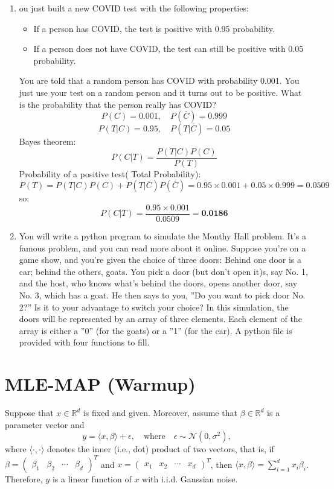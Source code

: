 \documentclass[a3paper,12pt]{extarticle} %
\begin{document}
\begin{enumerate}
\begin{enumerate}
        
    \end{enumerate}
    \item ou just built a new COVID test with the following properties:
    \begin{itemize}
        \item If a person has COVID, the test is positive with  0.95 probability.
        \item If a person does not have COVID, the test can still be positive with 0.05 probability.
    \end{itemize}
    You are told that a random person has COVID with probability 0.001. You just use your test on a random person and it turns out to be positive. What is the probability that the person really has COVID?
    \[
        P(C) = 0.001, \quad P(\bar{C}) = 0.999
    \]
    \[
        P(T | C) = 0.95, \quad P(T | \bar{C}) = 0.05
    \]
    Bayes theorem:
    \[
        P(C | T) = \frac{P(T | C)P(C)}{P(T)}
    \]
    Probability of a positive test( Total Probability):
    \[
        P(T) = P(T | C)P(C) + P(T | \bar{C})P(\bar{C}) = 0.95 \times 0.001 + 0.05 \times 0.999 = 0.0509
    \]
    so:
    \[
        P(C | T) = \frac{0.95 \times 0.001}{0.0509} = \textbf{0.0186}
    \]
    \item You will write a python program to simulate the Monthy Hall problem. It’s a famous problem, and you can read more about it online. Suppose you’re on a game show, and you’re given the choice of three doors: Behind one door is a car; behind the others, goats. You pick a door (but don’t open it)s, say No. 1, and the host, who knows what’s behind the doors, opens another door, say No. 3, which has a goat. He then says to you, ”Do
    you want to pick door No. 2?” Is it to your advantage to switch your choice? In this simulation, the doors will be represented by an array of three elements. Each element of the
    array is either a ”0” (for the goats) or a ”1” (for the car). A python file is provided with four functions to fill.
\end{enumerate}

\newpage
\section{MLE-MAP (Warmup)}

Suppose that \( x \in \mathbb{R}^d \) is fixed and given. Moreover, assume that \( \beta \in \mathbb{R}^d \) is a parameter vector and
\[
y = \langle x, \beta \rangle + \epsilon, \quad \text{where} \quad \epsilon \sim \mathcal{N}(0, \sigma^2),
\]
where \( \langle \cdot, \cdot \rangle \) denotes the inner (i.e., dot) product of two vectors, that is, if \( \beta = \begin{pmatrix} \beta_1 & \beta_2 & \cdots & \beta_d \end{pmatrix}^T \) and
\( x = \begin{pmatrix} x_1 & x_2 & \cdots & x_d \end{pmatrix}^T \), then \( \langle x, \beta \rangle = \sum_{i=1}^d x_i \beta_i \).
Therefore, \( y \) is a linear function of \( x \) with i.i.d. Gaussian noise.
\end{document}

